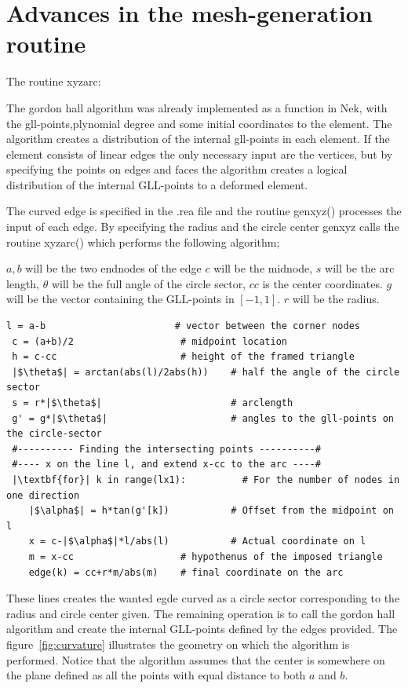 \section{Advances in the mesh-generation routine}
The routine xyzarc:

The gordon hall algorithm was already implemented as a function in Nek, with the gll-points,plynomial degree and some initial 
coordinates to the element. The algorithm creates a distribution of the internal gll-points in each element. 
If the element consists of linear edges the only necessary input are the vertices, but by specifying the points on edges and faces
the algorithm creates a logical distribution of the internal GLL-points to a deformed element. 

The curved edge is specified in the .rea file and the routine genxyz() processes the input of each edge. 
By specifying the radius and the circle center genxyz calls the routine xyzarc() which performs the following algorithm;

    $a,b$ will be the two endnodes of the edge 
    $c$ will be the midnode, $s$ will be the arc length, $\theta$ will be the full angle of the circle sector, $cc$ is the center coordinates.
    $g$ will be the vector containing the GLL-points in $[-1,1]$. $r$ will be the radius.

\begingroup
\fontsize{12pt}{14pt}
\begin{lstlisting}[escapechar=|]
 l = a-b                       # vector between the corner nodes
 c = (a+b)/2                   # midpoint location
 h = c-cc                      # height of the framed triangle
 |$\theta$| = arctan(abs(l)/2abs(h))    # half the angle of the circle sector
 s = r*|$\theta$|                       # arclength
 g' = g*|$\theta$|                      # angles to the gll-points on the circle-sector
 #---------- Finding the intersecting points ----------#
 #---- x on the line l, and extend x-cc to the arc ----#
 |\textbf{for}| k in range(lx1):          # For the number of nodes in one direction
    |$\alpha$| = h*tan(g'[k])           # Offset from the midpoint on l
    x = c-|$\alpha$|*l/abs(l)           # Actual coordinate on l
    m = x-cc                   # hypothenus of the imposed triangle
    edge(k) = cc+r*m/abs(m)    # final coordinate on the arc
\end{lstlisting}
\endgroup
These lines creates the wanted egde curved as a circle sector corresponding to the radius and circle center given.
The remaining operation is to call the gordon hall algorithm and create the internal GLL-points defined by the edges 
provided. The figure~\ref{fig:curvature} illustrates the geometry on which the algorithm is performed.
Notice that the algorithm assumes that the center is somewhere on the plane defined as all the 
points with equal distance to both $a$ and $b$.


